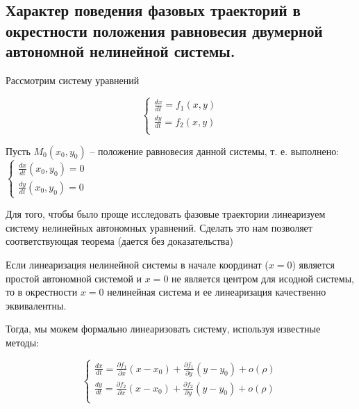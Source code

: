 
\subsection{Характер поведения фазовых траекторий в окрестности положения равновесия двумерной автономной нелинейной системы.}

Рассмотрим систему уравнений

\begin{equation}
  \begin{cases}
    \frac{d x}{d t} = f_1 (x, y) \\
    \frac{d y}{d t} = f_2 (x, y) \\
  \end{cases} 
\end{equation}

Пусть $M_0(x_0, y_0)$ -- положение равновесия данной системы, т. е. выполнено:
$\begin{cases}
  \frac{d x}{d t}(x_0, y_0) = 0 \\
  \frac{d y}{d t}(x_0, y_0) = 0
\end{cases}$

Для того, чтобы было проще исследовать фазовые траектории линеаризуем систему нелинейных автономных уравнений. Сделать это нам позволяет соответствующая теорема (дается без доказательства)

\begin{theorem}
  Если линеаризация нелинейной системы в начале координат ($x = 0$) является простой автономной системой и $x = 0$ не является центром для исодной системы, то в окрестности $x = 0$ нелинейная система и ее линеаризация качественно эквивалентны.
\end{theorem}

Тогда, мы можем формально линеаризовать систему, используя известные методы:

\begin{equation}
  \begin{cases}
    \frac{d x}{d t} = \frac{\partial f_1}{\partial x} (x - x_0) + \frac{\partial f_1}{\partial y} (y - y_0) + o(\rho) \\
    \frac{d y}{d t} = \frac{\partial f_2}{\partial x} (x - x_0) + \frac{\partial f_2}{\partial y} (y - y_0) + o(\rho) \\        
  \end{cases}
\end{equation}

